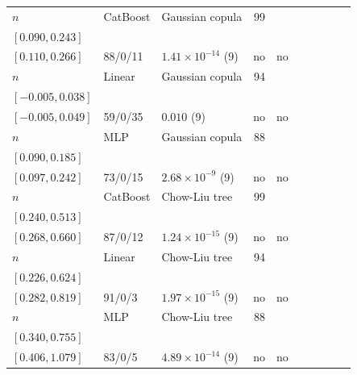 \begin{longtable}{@{}ll>{\raggedright\arraybackslash}p{1.1in}rllrlll@{}}
$n$ & CatBoost & Gaussian copula & 99 & \begin{tabular}[t]{@{}l@{}}$0.196$\\\tiny$[0.090, 0.243]$\end{tabular} & \begin{tabular}[t]{@{}l@{}}$0.202$\\\tiny$[0.110, 0.266]$\end{tabular} & 88/0/11 & $1.41\times 10^{-14}$ (9) & no & no \\
$n$ & Linear & Gaussian copula & 94 & \begin{tabular}[t]{@{}l@{}}$0.008$\\\tiny$[-0.005, 0.038]$\end{tabular} & \begin{tabular}[t]{@{}l@{}}$0.020$\\\tiny$[-0.005, 0.049]$\end{tabular} & 59/0/35 & $0.010$ (9) & no & no \\
$n$ & MLP & Gaussian copula & 88 & \begin{tabular}[t]{@{}l@{}}$0.132$\\\tiny$[0.090, 0.185]$\end{tabular} & \begin{tabular}[t]{@{}l@{}}$0.157$\\\tiny$[0.097, 0.242]$\end{tabular} & 73/0/15 & $2.68\times 10^{-9}$ (9) & no & no \\
$n$ & CatBoost & Chow-Liu tree & 99 & \begin{tabular}[t]{@{}l@{}}$0.313$\\\tiny$[0.240, 0.513]$\end{tabular} & \begin{tabular}[t]{@{}l@{}}$0.369$\\\tiny$[0.268, 0.660]$\end{tabular} & 87/0/12 & $1.24\times 10^{-15}$ (9) & no & no \\
$n$ & Linear & Chow-Liu tree & 94 & \begin{tabular}[t]{@{}l@{}}$0.342$\\\tiny$[0.226, 0.624]$\end{tabular} & \begin{tabular}[t]{@{}l@{}}$0.481$\\\tiny$[0.282, 0.819]$\end{tabular} & 91/0/3 & $1.97\times 10^{-15}$ (9) & no & no \\
$n$ & MLP & Chow-Liu tree & 88 & \begin{tabular}[t]{@{}l@{}}$0.489$\\\tiny$[0.340, 0.755]$\end{tabular} & \begin{tabular}[t]{@{}l@{}}$0.620$\\\tiny$[0.406, 1.079]$\end{tabular} & 83/0/5 & $4.89\times 10^{-14}$ (9) & no & no \\

\end{longtable}
